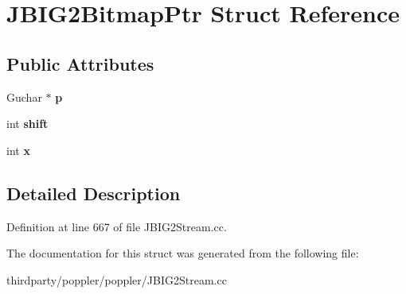 \hypertarget{struct_j_b_i_g2_bitmap_ptr}{}\section{J\+B\+I\+G2\+Bitmap\+Ptr Struct Reference}
\label{struct_j_b_i_g2_bitmap_ptr}
\subsection*{Public Attributes}
\begin{DoxyCompactItemize}
\item 
\mbox{\label{struct_j_b_i_g2_bitmap_ptr_a34bfc3b5b2932c4433f60e0520741ac1}} 
Guchar $\ast$ {\bfseries p}
\item 
\mbox{\label{struct_j_b_i_g2_bitmap_ptr_a23498bec4dbf0af118b52e8bb4e14361}} 
int {\bfseries shift}
\item 
\mbox{\label{struct_j_b_i_g2_bitmap_ptr_a11bb12f3b1314f738b770aa603427db2}} 
int {\bfseries x}
\end{DoxyCompactItemize}


\subsection{Detailed Description}


Definition at line 667 of file J\+B\+I\+G2\+Stream.\+cc.



The documentation for this struct was generated from the following file\+:\begin{DoxyCompactItemize}
\item 
thirdparty/poppler/poppler/J\+B\+I\+G2\+Stream.\+cc\end{DoxyCompactItemize}
